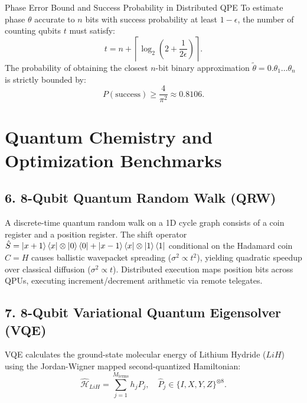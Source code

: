 \begin{theorembox}{Phase Error Bound and Success Probability in Distributed QPE}
To estimate phase $\theta$ accurate to $n$ bits with success probability at least $1 - \epsilon$, the number of counting qubits $t$ must satisfy:
\begin{equation}
    t = n + \left\lceil \log_2\left( 2 + \frac{1}{2\epsilon} \right) \right\rceil.
    \label{eq:qpe_counting_qubits_bound}
\end{equation}
The probability of obtaining the closest $n$-bit binary approximation $\tilde{\theta} = 0.\theta_1 \dots \theta_n$ is strictly bounded by:
\begin{equation}
    P(\text{success}) \ge \frac{4}{\pi^2} \approx 0.8106.
\end{equation}
\end{theorembox}

\section{Quantum Chemistry and Optimization Benchmarks}
\label{sec:vqe_qaoa_benchmarks}

\subsection{6. 8-Qubit Quantum Random Walk (QRW)}
A discrete-time quantum random walk on a 1D cycle graph consists of a coin register and a position register. The shift operator $\hat{S} = \ket{x+1}\bra{x} \otimes \ket{0}\bra{0} + \ket{x-1}\bra{x} \otimes \ket{1}\bra{1}$ conditional on the Hadamard coin $\hat{C} = H$ causes ballistic wavepacket spreading ($\sigma^2 \propto t^2$), yielding quadratic speedup over classical diffusion ($\sigma^2 \propto t$). Distributed execution maps position bits across QPUs, executing increment/decrement arithmetic via remote telegates.

\subsection{7. 8-Qubit Variational Quantum Eigensolver (VQE)}
VQE calculates the ground-state molecular energy of Lithium Hydride ($LiH$) using the Jordan-Wigner mapped second-quantized Hamiltonian:
\begin{equation}
    \hat{\mathcal{H}}_{LiH} = \sum_{j=1}^{M_{\text{terms}}} h_j \hat{P}_j, \quad \hat{P}_j \in \{I, X, Y, Z\}^{\otimes 8}.
\end{equation}

